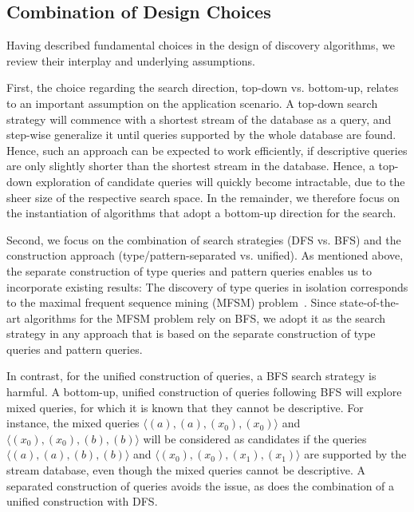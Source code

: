 \subsection{Combination of Design Choices}
\label{sec:combinations}

Having described fundamental choices in the design of discovery algorithms,
we review their interplay and underlying assumptions.


First, the choice regarding the search direction, top-down
vs. bottom-up, relates to an important assumption on the application scenario. A
top-down search strategy will commence with a shortest stream of the
database as a query, and step-wise generalize it until queries supported by
the whole database are found. Hence, such an approach can be expected
to work efficiently, if descriptive queries are only slightly shorter than
the shortest stream in the database.
  Hence, a top-down exploration of candidate queries will
quickly become intractable, due to the sheer size of the
respective search space. In the remainder, we therefore focus on the
instantiation of algorithms that adopt a bottom-up direction for
the search.


Second, we focus on the combination of search strategies (DFS vs. BFS) and
the construction approach (type/pattern-separated vs. unified). As mentioned
above, the separate construction of type queries and pattern queries enables
us to incorporate existing results: The discovery of type queries in
isolation corresponds to the maximal frequent sequence mining (MFSM)
problem~\cite{agrawal1995}. Since state-of-the-art algorithms for the MFSM
problem rely on BFS,
we adopt it as the search strategy in any approach that is based on the
separate construction of type queries and pattern queries.

In contrast, for the unified construction of queries, a BFS search strategy is
harmful. A bottom-up, unified
construction of queries following BFS will explore mixed queries, for
which it is known that they cannot be descriptive. For instance, the mixed
queries
$\langle (a),(a),(x_0),(x_0)\rangle$ and $\langle (x_0),(x_0),(b),(b) \rangle$ will be
considered as candidates if the queries $\langle (a),(a),(b),(b) \rangle$ and
$\langle (x_0),(x_0),(x_1),(x_1) \rangle$ are supported by the
stream database, even
though the mixed queries cannot be descriptive. A separated construction of
queries avoids the issue, as
does the combination of a unified construction with DFS.



